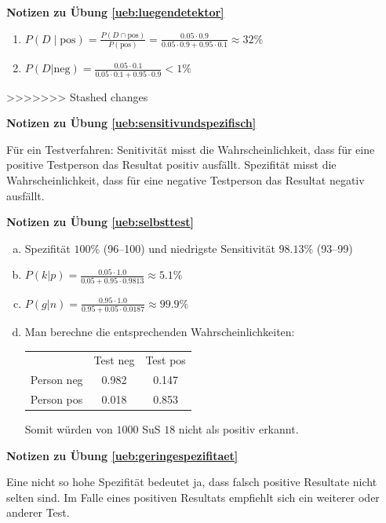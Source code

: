 \documentclass[%
<<<<<<< Updated upstream
11pt,%
twoside,%
titlepage,%
german,%
=======
11pt,%
twoside,%
titlepage,%
swissgerman,%
>>>>>>> Stashed changes
headsepline%
]{scrartcl}
\newcommand{\faReturnGray}{\textcolor{gray}{\faMailReply}} %
\newcommand{\spaltenheight}{\rule{0mm}{3ex}}
\newcommand{\spaltensep}{\\[1ex]}
\theoremstyle{definition}
\theoremstyle{plain}
\newcommand{\concatueb}[1]{ueb:#1}%
\newcommand{\concatlsg}[1]{lsg:#1}%
\newenvironment{lsg}[1]{%
    \par\noindent\textbf{Notizen zu Übung \ref{\concatueb{#1}}}\label{\concatlsg{#1}}
    \hfill\hyperref[\concatueb{#1}]{\faReturnGray}\par %
}{%
    \par%
}
\newcommand{\concatueb}[1]{ueb:#1}%
\newcommand{\concatlsg}[1]{lsg:#1}%
\newenvironment{lsg}[1]{%
    \par\noindent\textbf{Notizen zu Übung \ref{\concatueb{#1}}.}%
    \label{\concatlsg{#1}}
}{%
    \par%
}
\begin{document}
\begin{lsg}{luegendetektor}
    \begin{enumerate}
        \item $P(D\mid\text{pos})=\frac{P(D\cap\text{pos})}{P(\text{pos})}=\frac{0.05\cdot 0.9}{0.05\cdot0.9+0.95\cdot0.1}\approx32\%$
        \item $P(D|\text{neg})=\frac{0.05\cdot0.1}{0.05\cdot0.1+0.95\cdot0.9}<1\%$
    \end{enumerate}
\end{lsg}

>>>>>>> Stashed changes
\begin{lsg}{sensitivundspezifisch}
    Für ein Testverfahren: Senitivität misst die Wahrscheinlichkeit, dass für eine positive Testperson das Resultat positiv ausfällt. Spezifität misst die Wahrscheinlichkeit, dass für eine negative Testperson das Resultat negativ ausfällt.
\end{lsg}
\begin{lsg}{selbsttest}
    \begin{enumerate}[a)]
        \item Spezifität $100\%$ (96--100) und niedrigste Sensitivität $98.13\%$ (93--99)
        \item $P(k|p)=\frac{0.05\cdot1.0}{0.05+0.95\cdot0.9813}\approx5.1\%$
        \item $P(g|n)=\frac{0.95\cdot1.0}{0.95+0.05\cdot0.0187}\approx99.9\%$
        \item Man berechne die entsprechenden Wahrscheinlichkeiten:\\
        
        \begin{table}[h]
\begin{center}
\begin{tabular}{|l|c|c|}
\hline
\rowcolor{Gray}\spaltenheight & Test neg & Test pos \spaltensep \hhline{|-|-|-|}
\rowcolor{lightyellow}\spaltenheight  Person neg & 0.982 & 0.147 \spaltensep \hhline{|-|-|-|}
\rowcolor{Gray}\spaltenheight  Person pos & 0.018 & 0.853 \spaltensep \hline
\end{tabular}
\end{center}
\end{table}
Somit würden von $1000$ SuS $18$ nicht als positiv erkannt.
    \end{enumerate}
\end{lsg}
\begin{lsg}{geringespezifitaet}
    Eine nicht so hohe Spezifität bedeutet ja, dass falsch positive Resultate nicht selten sind. Im Falle eines positiven Resultats empfiehlt sich ein weiterer oder anderer Test.
\end{lsg}
\end{document}
